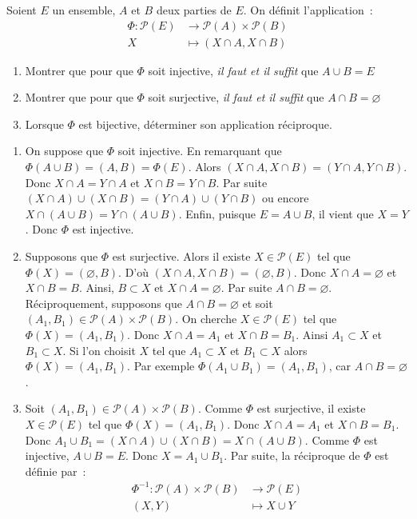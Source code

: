 \begin{exercise}[from=Devoir SR MPI 2010]
	Soient $E$ un ensemble, $A$ et $B$ deux parties de $E$. On définit l'application :
	\begin{align*}
		\Phi:  \mathcal{P}(E)&\longrightarrow \mathcal{P}(A)\times \mathcal{P}(B)\\
		X &\longmapsto (X \cap A, X \cap B)
	\end{align*}
	\begin{enumerate}
		\item Montrer que pour que $\Phi$ soit injective, \textit{il faut et il suffit} que $A\cup B = E$
		\item Montrer que pour que $\Phi$ soit surjective, \textit{il faut et il suffit} que $A\cap B = \varnothing$
		\item Lorsque $\Phi$ est bijective, déterminer son application réciproque.
	\end{enumerate}

	\cor
	\begin{enumerate}
		\item On suppose que $\Phi$ soit injective. En remarquant que $\Phi(A \cup B) =(A,B)=\Phi(E)$. Alors $(X\cap A, X \cap B) = (Y \cap A, Y \cap B).$ Donc $X \cap A = Y \cap A$ et $X \cap B = Y \cap B$. Par suite $(X \cap A) \cup (X \cap B) = (Y \cap A) \cup (Y \cap B)$ ou encore $X\cap (A \cup B) = Y \cap(A \cup B)$. Enfin, puisque $E=A \cup B$, il  vient que $X=Y$. Donc $\Phi$ est injective.
		\item Supposons que $\Phi$ est surjective. Alors il existe $X \in \mathcal{P}(E)$ tel que $\Phi(X)=(\varnothing, B)$. D'où $(X \cap A, X \cap B)=(\varnothing, B)$. Donc $X \cap A = \varnothing$ et $X\cap B = B$. Ainsi, $B \subset X$ et $X \cap A = \varnothing$. Par suite $A\cap B = \varnothing$. Réciproquement, supposons que $A\cap B=\varnothing$ et soit $(A_1, B_1)\in \mathcal{P}(A)\times \mathcal{P}(B)$. On cherche $X\in \mathcal{P}(E)$ tel que $\Phi (X)=(A_1,B_1)$. Donc $X\cap A =A_1$ et $X\cap B = B_1$. Ainsi $A_1 \subset X$ et $B_1 \subset X$. Si l'on choisit $X$ tel que $A_1 \subset X$  et $B_1 \subset X$ alors $\Phi (X)=(A_1,B_1)$. Par exemple $\Phi (A_1\cup B_1)=(A_1,B_1)$, car $A\cap B=\varnothing$.
		\item Soit $(A_1, B_1)\in \mathcal{P}(A)\times \mathcal{P}(B)$. Comme $\Phi$ est surjective, il existe $X\in \mathcal{P}(E)$ tel que $\Phi (X)=(A_1,B_1)$. Donc $X\cap A =A_1$ et $X\cap B = B_1$. Donc $A_1 \cup B_1 =(X\cap A)\cup (X\cap B) = X\cap (A\cup B)$. Comme $\Phi$ est injective, $A\cup B=E$. Donc $X=A_1\cup B_1$. Par suite, la réciproque de $\Phi$ est définie par :
		\begin{align*}
			\Phi^{-1}: \mathcal{P}(A)\times \mathcal{P}(B) &\longrightarrow \mathcal{P}(E)\\
			(X,Y) &\longmapsto X\cup Y
		\end{align*}
	\end{enumerate}
\end{exercise}

